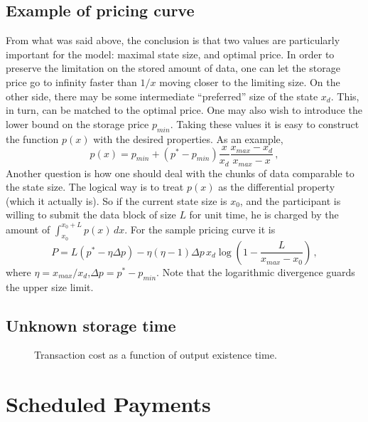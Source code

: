 \documentclass[]{llncs}   %
\newcommand{\authnote}[2]{\marginpar{\parbox{\marginparwidth}{\tiny %
  \textsf{#1 {\textcolor{blue}{notes: #2}}}}}%
  \textcolor{blue}{\textbf{\dag}}}
\newcommand{\authnote}[2]{
  \textsf{#1\textcolor{blue}{ #2}}}
\newcommand{\authnote}[2]{}
\newcommand{\vk}[1]{{\authnote{\textcolor{red}{V:}}{#1}}}
\begin{document}
\subsection{Example of pricing curve}
From what was said above, the conclusion is that two values are particularly
important for the model: maximal state size, and optimal price. In order to
preserve the limitation on the stored amount of data, one can let the storage price go to infinity
faster than $1/x$ moving closer to the limiting size. On the other side, there
may be some intermediate ``preferred'' size of the state $x_d$. This, in turn,
can be matched to the optimal price. One may also wish to introduce the lower
bound on the storage price $p_{min}$. Taking these values it is easy to
construct the function $p(x)$ with the desired properties. As an example,
\begin{equation}
    p(x) = p_{min}+(p^*-p_{min})\frac{x}{x_d}\frac{x_{max}-x_d}{x_{max}-x}\,,
    \label{eq:sample_price}
\end{equation}
Another question is how one should deal with the chunks of data comparable to
the state size. The logical way is to treat $p(x)$ as the differential property
(which it actually is). So if the current state size is $x_0$, and the
participant is willing to submit the data block of size $L$ for unit time, he is
charged by the amount of $\int_{x_0}^{x_0+L}p(x)\,dx$. For the sample pricing
curve it is
\begin{equation}
    P = L\left(p^*-\eta \Delta p \right)
    -
    \eta(\eta-1)\Delta p\, x_d
    \log\left(1-\frac{L}{x_{max}-x_0}\right)\,,
    \label{eq:sample_chunk}
\end{equation}
where $\eta=x_{max}/x_d$,$\Delta p=p^*-p_{min}$. Note that the logarithmic
divergence guards the upper size limit.

\subsection{Unknown storage time}
\vk{Here --- Dima's idea as we discussed it in Moscow.}
\begin{figure}
    \center
    
    \caption{Transaction cost as a function of output existence time.\label{fig:max_t}}
\end{figure}

\section{Scheduled Payments}
\end{document}
